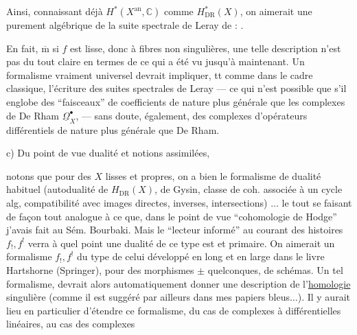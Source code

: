 Ainsi, connaissant déjà $H^*(X^{\mathrm{an}},\mathbb C)$ comme $H_{\mathrm{DR}}^*(X)$, on aimerait une  purement algébrique de la suite spectrale de Leray de
 :
.

En fait, $\overline{\mathrm m}$ si $f$ est lisse, donc à fibres non singulières, une telle description n'est pas du tout claire en termes de ce qui a été vu jusqu'à maintenant.
\deleted{[les $\mathbb R^q f_*(\underline\Omega_{X/\mathbb C}^\bullet)$}
Un formalisme
 vraiment universel devrait impliquer, tt comme dans le cadre classique, l'écriture des suites spectrales de Leray — ce qui n'est possible que s'il englobe des ``faisceaux'' de coefficients de nature plus générale que les complexes de De Rham $\underline\Omega_X^\bullet$, —  sans doute, également, des complexes d'opérateurs différentiels de nature plus générale que De Rham.

c) Du point de vue dualité et notions assimilées,

notons que pour des $X$ lisses et propres, on a bien le formalisme de dualité habituel (autodualité de $H_{\mathrm{DR}}(X)$,   de Gysin, classe de coh. associée à un cycle alg,  compatibilité avec images directes, inverses, intersections) $\ldots$ le tout se faisant de façon tout analogue à ce que, dans le point de vue ``cohomologie de Hodge'' j'avais fait au Sém. Bourbaki.
Mais le ``lecteur informé'' au courant des histoires $f_!,f^!$ verra à quel point une  dualité de ce type est  et primaire.
On aimerait un formalisme $f_!,f^!$ du type de celui développé en long et en large dans le livre Hartshorne (Springer),  pour des morphismes $\pm$ quelconques,  de schémas.
Un tel formalisme,  devrait alors automatiquement donner  une description de l'\uline{homologie} singulière (comme il est suggéré par ailleurs dans mes papiers bleus$\ldots$).
Il y aurait lieu en particulier d'étendre ce formalisme, du cas de complexes à différentielles linéaires, au cas des complexes

